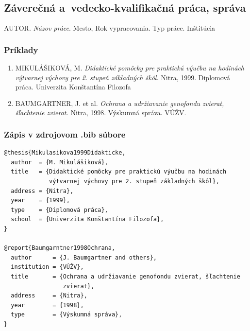 \documentclass[../../../thesis.tex]{subfiles}
\begin{document}
\subsection{Záverečná a~vedecko-kvalifikačná práca, správa}
AUTOR. \textit{Názov práce}. Mesto, Rok vypracovania. Typ práce. Inštitúcia

\subsubsection*{\normalsize Príklady}
\begin{enumerate}
  \item MIKULÁŠIKOVÁ, M. \textit{Didaktické pomôcky pre praktickú výučbu na hodinách výtvarnej výchovy pre 2. stupeň základných škôl.} Nitra, 1999. Diplomová práca. Univerzita Konštantína Filozofa

  \item BAUMGARTNER, J. et al. \textit{Ochrana a udržiavanie genofondu zvierat, šľachtenie zvierat.} Nitra, 1998. Výskumná správa. VÚŽV.
\end{enumerate}

\subsubsection*{\normalsize Zápis v zdrojovom .bib súbore}
\begin{verbatim}
@thesis{Mikulasikova1999Didakticke,
  author  = {M. Mikulášiková},
  title   = {Didaktické pomôcky pre praktickú výučbu na hodinách
             výtvarnej výchovy pre 2. stupeň základných škôl},
  address = {Nitra},
  year    = {1999},
  type    = {Diplomová práca},
  school  = {Univerzita Konštantína Filozofa},
}

@report{Baumgarntner1998Ochrana,
  author      = {J. Baumgartner and others},
  institution = {VÚŽV},
  title       = {Ochrana a udržiavanie genofondu zvierat, šľachtenie
                 zvierat},
  address     = {Nitra},
  year        = {1998},
  type        = {Výskumná správa},
}
\end{verbatim}
\end{document}
